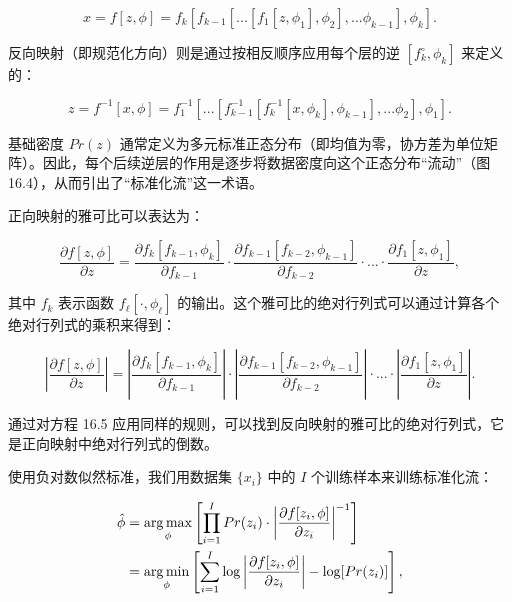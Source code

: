 \begin{equation}
x = f[z, \phi] = f_k \left[ f_{k-1} \left[ ... \left[ f_1[z, \phi_1], \phi_2 \right], ... \phi_{k-1} \right], \phi_k \right]. 
\end{equation}

反向映射（即规范化方向）则是通过按相反顺序应用每个层的逆 \([f_k^{\circ}, \phi_k]\) 来定义的：

\begin{equation}
z = f^{-1}[x, \phi] = f_1^{-1} \left[ ... \left[ f_{k-1}^{-1} \left[ f_k^{-1}[x, \phi_k], \phi_{k-1} \right], ... \phi_2 \right], \phi_1 \right]. 
\end{equation}

基础密度 \(Pr(z)\) 通常定义为多元标准正态分布（即均值为零，协方差为单位矩阵）。因此，每个后续逆层的作用是逐步将数据密度向这个正态分布“流动”（图 16.4），从而引出了“标准化流”这一术语。

正向映射的雅可比可以表达为：

\begin{equation}
\frac{\partial f[z, \phi]}{\partial z} = \frac{\partial f_k[f_{k-1}, \phi_k]}{\partial f_{k-1}} \cdot \frac{\partial f_{k-1}[f_{k-2}, \phi_{k-1}]}{\partial f_{k-2}} \cdot ... \cdot \frac{\partial f_1[z, \phi_1]}{\partial z}, 
\end{equation}

其中 \(f_k\) 表示函数 \(f_{\ell}[\cdot, \phi_{\ell}]\) 的输出。这个雅可比的绝对行列式可以通过计算各个绝对行列式的乘积来得到：

\begin{equation}
\left| \frac{\partial f[z, \phi]}{\partial z} \right| = \left| \frac{\partial f_k[f_{k-1}, \phi_k]}{\partial f_{k-1}} \right| \cdot \left| \frac{\partial f_{k-1}[f_{k-2}, \phi_{k-1}]}{\partial f_{k-2}} \right| \cdot ... \cdot \left| \frac{\partial f_1[z, \phi_1]}{\partial z} \right|. 
\end{equation}

通过对方程 16.5 应用同样的规则，可以找到反向映射的雅可比的绝对行列式，它是正向映射中绝对行列式的倒数。

使用负对数似然标准，我们用数据集 \(\{x_i\}\) 中的 \(I\) 个训练样本来训练标准化流：


\begin{align}
\hat{\phi} &= \underset{\phi}{\arg\max} \left[ \prod_{i=1}^I Pr(z_i) \cdot \left| \frac{\partial f[z_i, \phi]}{\partial z_i} \right|^{-1} \right] \notag \\
&= \underset{\phi}{\arg\min} \left[ \sum_{i=1}^I \log \left| \frac{\partial f[z_i, \phi]}{\partial z_i} \right| - \log[Pr(z_i)] \right], 
\end{align} 


